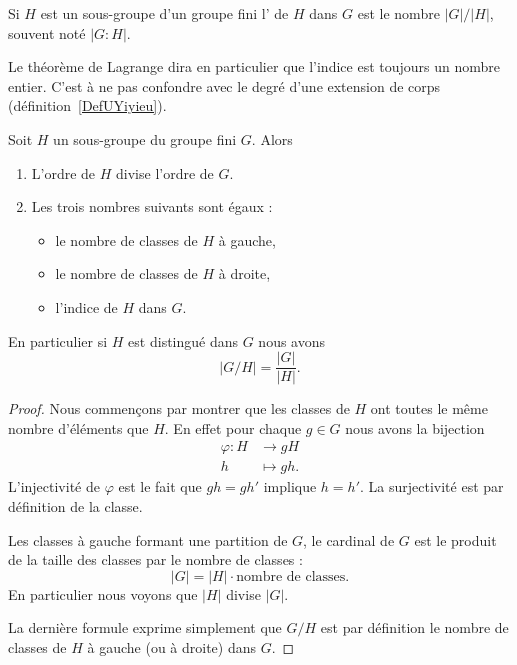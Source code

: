 \begin{definition}      \label{DEFooMPIAooIeZNaR}
    Si \( H\) est un sous-groupe d'un groupe fini l' de \( H\) dans \( G\) est le nombre \( | G |/| H |\), souvent noté \( | G:H |\).
\end{definition}

Le théorème de Lagrange dira en particulier que l'indice est toujours un nombre entier. C'est à ne pas confondre avec le degré d'une extension de corps (définition~\ref{DefUYiyieu}).


\begin{theorem}    \label{ThoLagrange}
    Soit \( H\) un sous-groupe du groupe fini \( G\).  Alors
    \begin{enumerate}
        \item   \label{ITEMooDPKSooNpOusd}
    L'ordre de \( H\) divise l'ordre de \( G\).
\item
    Les trois nombres suivants sont égaux :
    \begin{itemize}
        \item
            le nombre de classes de \( H\) à gauche,
        \item
            le nombre de classes de \( H\) à droite,
        \item
            l'indice de \( H\) dans \( G\).
    \end{itemize}
    \end{enumerate}
    En particulier si \( H\) est distingué dans \( G\) nous avons
    \begin{equation}
        | G/H |=\frac{ | G | }{ | H | }.
    \end{equation}
\end{theorem}

\begin{proof}
    Nous commençons par montrer que les classes de \( H\) ont toutes le même nombre d'éléments que \( H\). En effet pour chaque \( g\in G\) nous avons la bijection
    \begin{equation}
        \begin{aligned}
            \varphi\colon H&\to gH \\
            h&\mapsto gh.
        \end{aligned}
    \end{equation}
    L'injectivité de \( \varphi\) est le fait que \( gh=gh'\) implique \( h=h'\). La surjectivité est par définition de la classe.

    Les classes à gauche formant une partition de \( G\), le cardinal de \( G\) est le produit de la taille des classes par le nombre de classes :
    \begin{equation}
        | G |=| H |\cdot\text{nombre de classes}.
    \end{equation}
    En particulier nous voyons que \( | H |\) divise \( | G |\).

    La dernière formule exprime simplement que \( G/H\) est par définition le nombre de classes de \( H\) à gauche (ou à droite) dans \( G\).
\end{proof}

